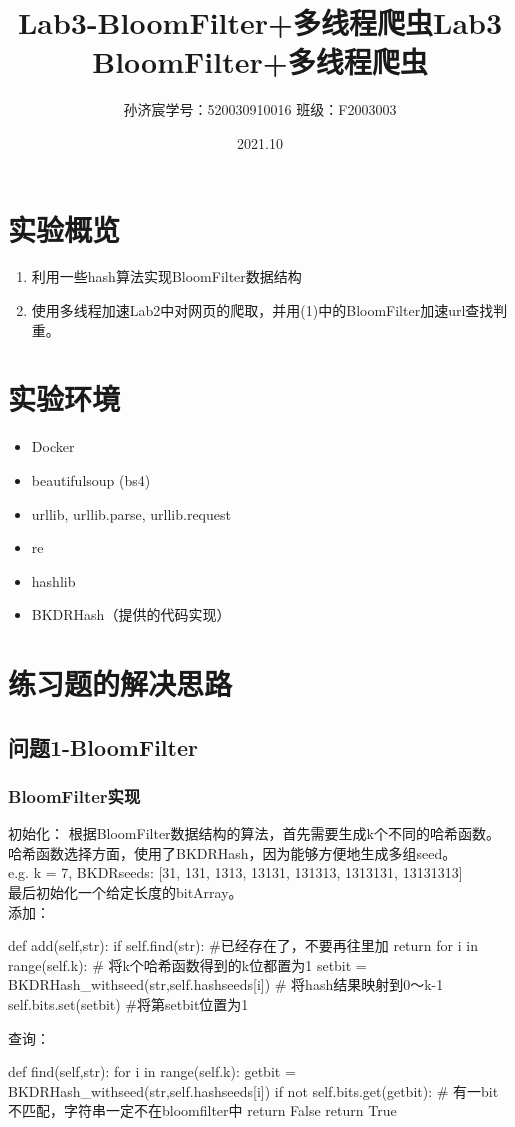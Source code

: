 \documentclass[12pt,a4paper]{article}
\title{Lab3-BloomFilter+多线程爬虫}
\title{Lab3 \quad BloomFilter+多线程爬虫}
\date{2021.10}
\author{孙济宸\quad \quad 学号：520030910016 \quad  \quad 班级：F2003003}
\begin{document}
\maketitle
\section{实验概览}
\begin{enumerate}
	\item 利用一些hash算法实现BloomFilter数据结构
	\item 使用多线程加速Lab2中对网页的爬取，并用(1)中的BloomFilter加速url查找判重。
\end{enumerate}
\section{实验环境}
\begin{itemize}
	\item Docker
	\item beautifulsoup (bs4)
	\item urllib, urllib.parse, urllib.request
	\item re
	\item hashlib
	\item BKDRHash（提供的代码实现）
\end{itemize}
\newpage

\section{练习题的解决思路}
\subsection{问题1-BloomFilter}
\subsubsection{BloomFilter实现}
初始化：
根据BloomFilter数据结构的算法，首先需要生成k个不同的哈希函数。
哈希函数选择方面，使用了BKDRHash，因为能够方便地生成多组seed。
\\ e.g. k = 7,  BKDRseeds: [31, 131, 1313, 13131, 131313, 1313131, 13131313]\\
最后初始化一个给定长度的bitArray。\\
添加：
\begin{python}
def add(self,str):
        if self.find(str):  #已经存在了，不要再往里加
            return
        for i in range(self.k):     # 将k个哈希函数得到的k位都置为1
            setbit = BKDRHash_withseed(str,self.hashseeds[i]) %
            # 将hash结果映射到0～k-1
            self.bits.set(setbit)	 #将第setbit位置为1
\end{python}
查询：
\begin{python} 
    def find(self,str):
        for i in range(self.k):
            getbit = BKDRHash_withseed(str,self.hashseeds[i]) %
            if not self.bits.get(getbit):  
            # 有一bit不匹配，字符串一定不在bloomfilter中
                return False
        return True 
\end{python}
\end{document}
